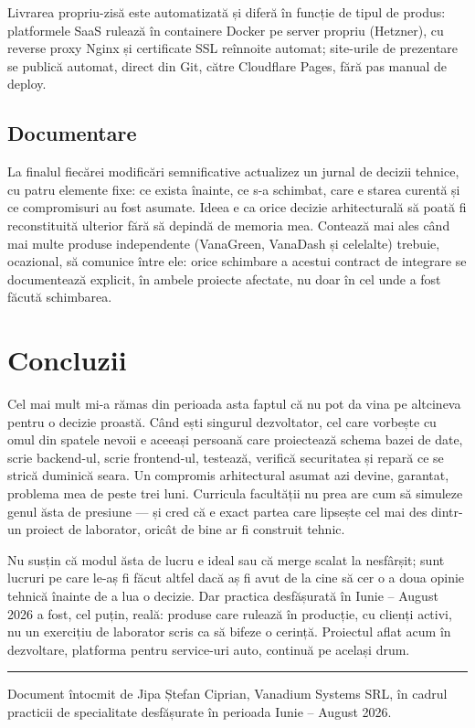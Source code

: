 \documentclass[11pt, a4paper]{article}
\begin{document}
Livrarea propriu-zisă este automatizată și diferă în funcție de tipul de produs: platformele
SaaS rulează în containere Docker pe server propriu (Hetzner), cu reverse proxy Nginx și
certificate SSL reînnoite automat; site-urile de prezentare se publică automat, direct din Git,
către Cloudflare Pages, fără pas manual de deploy.

\subsection{Documentare}

La finalul fiecărei modificări semnificative actualizez un jurnal de decizii tehnice, cu patru
elemente fixe: ce exista înainte, ce s-a schimbat, care e starea curentă și ce compromisuri au
fost asumate. Ideea e ca orice decizie arhitecturală să poată fi reconstituită ulterior fără să
depindă de memoria mea. Contează mai ales când mai multe produse independente (VanaGreen,
VanaDash și celelalte) trebuie, ocazional, să comunice între ele: orice schimbare a acestui
contract de integrare se documentează explicit, în ambele proiecte afectate, nu doar în cel
unde a fost făcută schimbarea.


\section*{Concluzii}
\enlargethispage{6\baselineskip}

Cel mai mult mi-a rămas din perioada asta faptul că nu pot da vina pe altcineva pentru o decizie
proastă. Când ești singurul dezvoltator, cel care vorbește cu omul din spatele nevoii e aceeași
persoană care proiectează schema bazei de date, scrie backend-ul, scrie frontend-ul, testează,
verifică securitatea și repară ce se strică duminică seara. Un compromis arhitectural asumat azi
devine, garantat, problema mea de peste trei luni. Curricula facultății nu prea are cum să simuleze
genul ăsta de presiune — și cred că e exact partea care lipsește cel mai des dintr-un proiect de
laborator, oricât de bine ar fi construit tehnic.

Nu susțin că modul ăsta de lucru e ideal sau că merge scalat la nesfârșit; sunt lucruri pe care
le-aș fi făcut altfel dacă aș fi avut de la cine să cer o a doua opinie tehnică înainte de a lua o
decizie. Dar practica desfășurată în Iunie -- August 2026 a fost, cel puțin, reală: produse care
rulează în producție, cu clienți activi, nu un exercițiu de laborator scris ca să bifeze o
cerință. Proiectul aflat acum în dezvoltare, platforma pentru service-uri auto, continuă pe
același drum.

\vspace{1em}
\noindent\rule{\linewidth}{0.4pt}
\vspace{0.5em}

\noindent\small\color{vsgray}
Document întocmit de Jipa Ștefan Ciprian, Vanadium Systems SRL, în cadrul practicii de
specialitate desfășurate în perioada Iunie -- August 2026.
\end{document}
